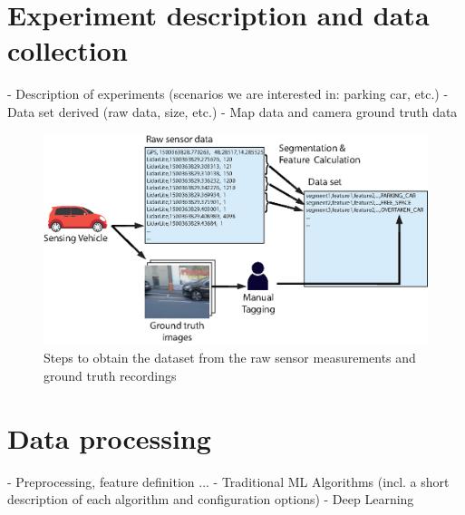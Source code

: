 \section{Experiment description and data collection}
\label{sec:experiment_description_data_collection}
- Description of experiments (scenarios we are interested in: parking car, etc.)
- Data set derived (raw data, size, etc.)
- Map data and camera ground truth data

\begin{figure}
	\centering
	\includegraphics[width=\textwidth]{img/obtaining-dataset-architecture.eps}
	\caption{Steps to obtain the dataset from the raw sensor measurements and ground truth recordings}
	\label{fig:dataset_architecture}
\end{figure}

\section{Data processing}
\label{sec:data_processing}
- Preprocessing, feature definition ...
- Traditional ML Algorithms (incl. a short description of each algorithm and configuration options)
- Deep Learning